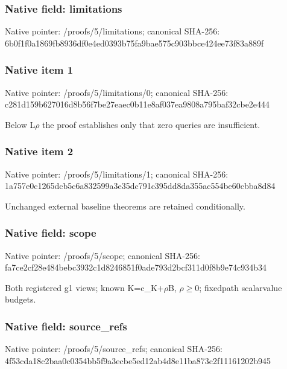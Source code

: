 \documentclass[10pt,a4paper]{article}
\begin{document}
\subsubsection{Native field: limitations}


Native pointer: /proofs/5/limitations; canonical SHA-256: 6b0f1f0a1869fb8936df0e4e\allowbreak{}d0393b75fa9bae575c903bbc\allowbreak{}e424ee73f83a889f



\subsubsection{Native item 1}


Native pointer: /proofs/5/limitations/0; canonical SHA-256: c281d159b627016d8b56f7be\allowbreak{}27eaec0b11e8af037ea9808a\allowbreak{}795baf32cbe2e444


Below L\ensuremath{\rho} the proof establishes only that zero queries are insufficient.


\subsubsection{Native item 2}


Native pointer: /proofs/5/limitations/1; canonical SHA-256: 1a757e0c1265dcb5c6a83259\allowbreak{}9a3e35dc791c395dd8da355a\allowbreak{}c554be60cbba8d84


Unchanged external baseline theorems are retained conditionally.


\subsubsection{Native field: scope}


Native pointer: /proofs/5/scope; canonical SHA-256: fa7ce2cf28e484bebc3932c1\allowbreak{}d8246851f0ade793d2bcf311\allowbreak{}d0f8b9e74c934b34


Both registered g1 views; known K=c\_K+\ensuremath{\rho}B, \ensuremath{\rho}\ensuremath{\ge}0; fixedpath scalarvalue budgets.


\subsubsection{Native field: source\_refs}


Native pointer: /proofs/5/source\_refs; canonical SHA-256: 4f53cda18c2baa0c0354bb5f\allowbreak{}9a3ecbe5ed12ab4d8e11ba87\allowbreak{}3c2f11161202b945
\end{document}
